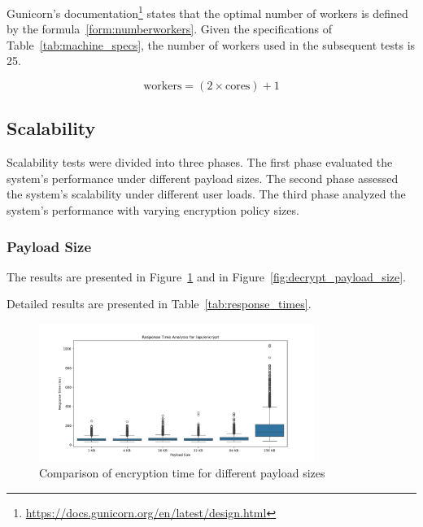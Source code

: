 \documentclass[cic,tc,english]{iiufrgs}
\begin{document}
            Gunicorn's documentation\footnote{\url{https://docs.gunicorn.org/en/latest/design.html}} states that the optimal number of workers is defined by the formula~\ref{form:numberworkers}. Given the specifications of Table~\ref{tab:machine_specs}, the number of workers used in the subsequent tests is 25.

            \begin{equation}
                \label{form:numberworkers}
                \text{workers} = (2 \times \text{cores}) + 1
            \end{equation}


        \subsection{Scalability}
            \label{sec:encryptiontime}
            Scalability tests were divided into three phases. The first phase evaluated the system's performance under different payload sizes. The second phase assessed the system's scalability under different user loads. The third phase analyzed the system's performance with varying encryption policy sizes.

            \subsubsection{Payload Size}
                The results are presented in Figure~\ref{fig:encrypt_payload_size} and in Figure~\ref{fig:decrypt_payload_size}.

                Detailed results are presented in Table~\ref{tab:response_times}.

                \begin{figure}
                    \centering
                    \includegraphics[width=0.8\textwidth]{images/phase2/response_time_api_encrypt.png}
                    \caption{Comparison of encryption time for different payload sizes}
                    \label{fig:encrypt_payload_size}
                \end{figure}
\end{document}
